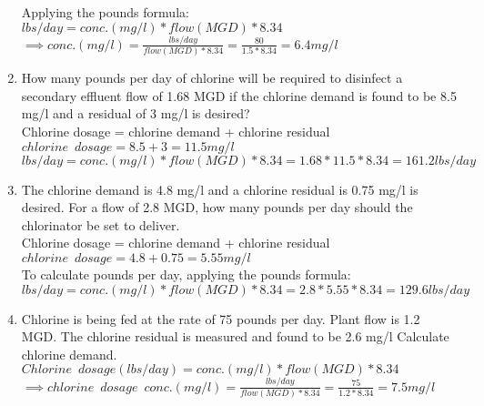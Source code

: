 \documentclass{article}
\begin{document}
\begin{enumerate}
Applying the pounds formula:\\  $lbs/day=conc. (mg/l)*flow(MGD)*8.34$\\
\vspace{0.25cm}
$\implies conc. (mg/l)=\frac{lbs/day}{flow(MGD)*8.34}=\frac{80}{1.5*8.34}=\boxed{6.4mg/l}$
\vspace{0.25cm}
\item How many pounds per day of chlorine will be required to disinfect a secondary effluent flow of 1.68 MGD if the chlorine demand is found to be 8.5 mg/l and a residual of 3 mg/l is desired?\\
\vspace{0.25cm}
Chlorine dosage = chlorine demand + chlorine residual\\
\vspace{0.25cm}
$chlorine \enspace dosage=8.5+3=11.5mg/l$\\
$lbs/day=conc. (mg/l)*flow(MGD)*8.34=1.68*11.5*8.34=\boxed{161.2lbs/day}$\\
\vspace{0.25cm}
\item The chlorine demand is 4.8 mg/l and a chlorine residual is 0.75 mg/l is desired. For a flow of 2.8 MGD, how many pounds per day should the chlorinator be set to deliver.\\
\vspace{0.25cm}
Chlorine dosage = chlorine demand + chlorine residual\\
\vspace{0.25cm}
$chlorine \enspace dosage=4.8+0.75=5.55mg/l$\\
\vspace{0.25cm}
To calculate pounds per day, applying the pounds formula:\\ 
\vspace{0.25cm}
$lbs/day=conc. (mg/l)*flow(MGD)*8.34=2.8*5.55*8.34=\boxed{129.6lbs/day}$\\
\vspace{0.25cm}
\item Chlorine is being fed at the rate of 75 pounds per day. Plant flow is 1.2 MGD. The chlorine residual is measured and found to be 2.6 mg/l Calculate chlorine demand.\\
\vspace{0.25cm}
$Chlorine \enspace dosage (lbs/day)=conc. (mg/l)*flow(MGD)*8.34$\\
\vspace{0.25cm}
$\implies chlorine \enspace dosage \enspace conc. (mg/l)=\frac{lbs/day}{flow(MGD)*8.34}=\frac{75}{1.2*8.34}=7.5mg/l$\\

\end{enumerate}
\end{document}
